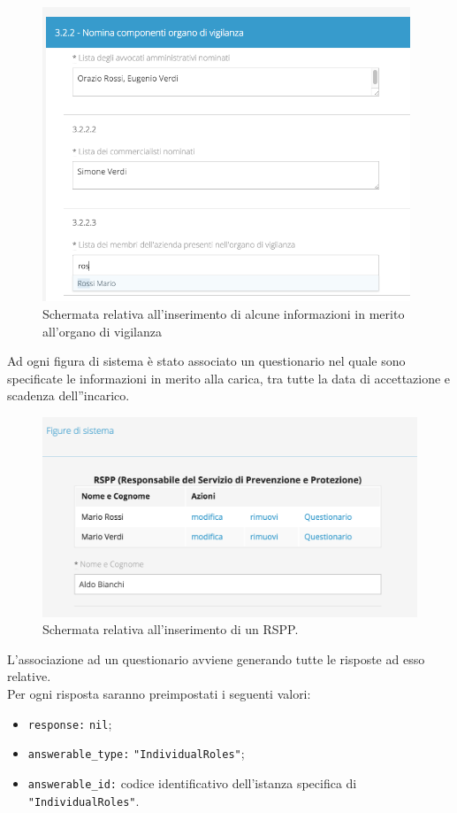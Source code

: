 	\begin{figure}[H]
		\begin{center}
			\includegraphics[width=11cm]{Pics/screen_organo_di_vigianza_con_autocompletamento.png}
			\caption{
				Schermata relativa all'inserimento di alcune informazioni in merito all'organo di vigilanza}
			\label{fig:ScreenOrganodiVigilanza}
		\end{center}
	\end{figure}
	
	Ad ogni figura di sistema è stato associato un questionario nel quale sono specificate le informazioni in merito alla carica, tra tutte la data di accettazione e scadenza dell''incarico.
	\begin{figure}[H]
		\begin{center}
			\includegraphics[width=12cm]{Pics/RemoteTrueRSPP.png}
			\caption{
				Schermata relativa all'inserimento di un RSPP.}
			\label{fig:ScreenRSPP}
		\end{center}
	\end{figure}	
	  L'associazione ad un questionario avviene generando tutte le risposte ad esso relative.\\
	  Per ogni risposta saranno preimpostati i seguenti valori:
	  \begin{itemize}
		  \item \texttt{response:} \texttt{nil};
		  \item \texttt{answerable\_type:} \texttt{"IndividualRoles"};
		  \item \texttt{answerable\_id:} codice identificativo dell'istanza specifica di \texttt{"IndividualRoles"}.
	  \end{itemize}

